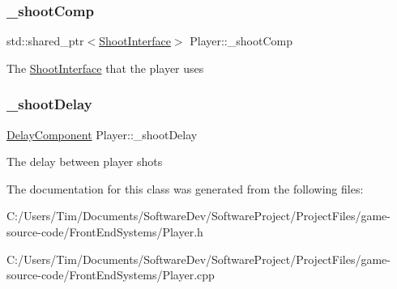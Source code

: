 \subsubsection{\texorpdfstring{\+\_\+shoot\+Comp}{\_shootComp}}
{\footnotesize\ttfamily std\+::shared\+\_\+ptr$<$\hyperlink{class_shoot_interface}{Shoot\+Interface}$>$ Player\+::\+\_\+shoot\+Comp\hspace{0.3cm}{\ttfamily [private]}}

The \hyperlink{class_shoot_interface}{Shoot\+Interface} that the player uses \mbox{\label{class_player_a6d672baf3630a81a32a8b9565129f559}} 
\subsubsection{\texorpdfstring{\+\_\+shoot\+Delay}{\_shootDelay}}
{\footnotesize\ttfamily \hyperlink{class_delay_component}{Delay\+Component} Player\+::\+\_\+shoot\+Delay\hspace{0.3cm}{\ttfamily [private]}}

The delay between player shots 

The documentation for this class was generated from the following files\+:\begin{DoxyCompactItemize}
\item 
C\+:/\+Users/\+Tim/\+Documents/\+Software\+Dev/\+Software\+Project/\+Project\+Files/game-\/source-\/code/\+Front\+End\+Systems/Player.\+h\item 
C\+:/\+Users/\+Tim/\+Documents/\+Software\+Dev/\+Software\+Project/\+Project\+Files/game-\/source-\/code/\+Front\+End\+Systems/Player.\+cpp\end{DoxyCompactItemize}
